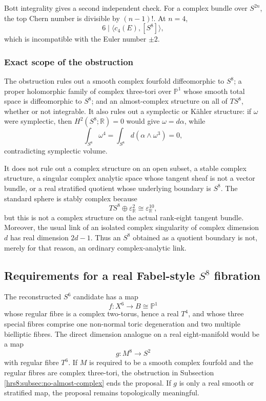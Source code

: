 Bott integrality gives a second independent check.  For a complex bundle
over $S^{2n}$, the top Chern number is divisible by $(n-1)!$.  At $n=4$,
\[
 6\mid\langle c_4(E),[S^8]\rangle,
\]
which is incompatible with the Euler number $\pm2$.

\subsubsection{Exact scope of the obstruction}
\label{hrs8:subsubsec:scope}

The obstruction rules out a smooth complex fourfold diffeomorphic to $S^8$;
a proper holomorphic family of complex three-tori over $\mathbb P^1$ whose
smooth total space is diffeomorphic to $S^8$; and an almost-complex structure
on all of $TS^8$, whether or not integrable.  It also rules out a symplectic
or K\"ahler structure: if $\omega$ were symplectic, then
$H^2(S^8;\mathbb R)=0$ would give $\omega=d\alpha$, while
\[
 \int_{S^8}\omega^4
 =\int_{S^8}d(\alpha\wedge\omega^3)=0,
\]
contradicting symplectic volume.

It does not rule out a complex structure on an open subset, a stable complex
structure, a singular complex analytic space whose tangent sheaf is not a
vector bundle, or a real stratified quotient whose underlying boundary is
$S^8$.  The standard sphere is stably complex because
\[
 TS^8\oplus\varepsilon^2_{\mathbb R}\cong\varepsilon^{10}_{\mathbb R},
\]
but this is not a complex structure on the actual rank-eight tangent bundle.
Moreover, the usual link of an isolated complex singularity of complex
dimension $d$ has real dimension $2d-1$.  Thus an $S^8$ obtained as a quotient
boundary is not, merely for that reason, an ordinary complex-analytic link.

\subsection{Requirements for a real Fabel-style \texorpdfstring{$S^8$}{S8} fibration}
\label{hrs8:subsec:real-fibration}

The reconstructed $S^6$ candidate has a map
\[
 f\colon X^6\longrightarrow B\cong\mathbb P^1
\]
whose regular fibre is a complex two-torus, hence a real $T^4$, and whose
three special fibres comprise one non-normal toric degeneration and two
multiple bielliptic fibres.  The direct dimension analogue on a real
eight-manifold would be a map
\[
 g\colon M^8\longrightarrow S^2
\]
with regular fibre $T^6$.  If $M$ is required to be a smooth complex
fourfold and the regular fibres are complex three-tori, the obstruction in
Subsection \ref{hrs8:subsec:no-almost-complex} ends the proposal.  If $g$ is
only a real smooth or stratified map, the proposal remains topologically
meaningful.

